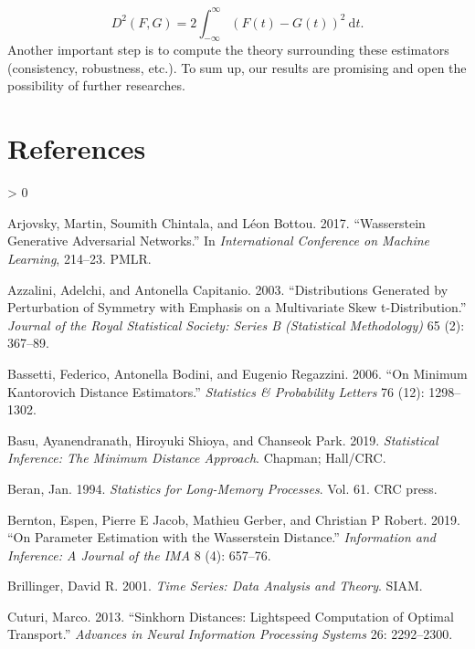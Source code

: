 \documentclass[
  11pt,
]{article}
\newlength{\cslhangindent}
\newenvironment{CSLReferences}[2] %
 {%
  \setlength{\parindent}{0pt}
  \ifodd #1 \everypar{\setlength{\hangindent}{\cslhangindent}}\ignorespaces\fi
  \ifnum #2 > 0
  \setlength{\parskip}{#2\baselineskip}
  \fi
 }%
 {}
\begin{document}
\[D^{2}(F, G)=2 \int_{-\infty}^{\infty}(F(t)-G(t))^{2} \mathrm{~d} t.\]
Another important step is to compute the theory surrounding these
estimators (consistency, robustness, etc.). To sum up, our results are
promising and open the possibility of further researches.

\newpage

\hypertarget{references}{%
\section*{References}\label{references}}

\hypertarget{refs}{}
\begin{CSLReferences}{1}{0}
\leavevmode\hypertarget{ref-arjovsky2017wasserstein}{}%
Arjovsky, Martin, Soumith Chintala, and Léon Bottou. 2017.
{``Wasserstein Generative Adversarial Networks.''} In
\emph{International Conference on Machine Learning}, 214--23. PMLR.

\leavevmode\hypertarget{ref-azzalini2003distributions}{}%
Azzalini, Adelchi, and Antonella Capitanio. 2003. {``Distributions
Generated by Perturbation of Symmetry with Emphasis on a Multivariate
Skew t-Distribution.''} \emph{Journal of the Royal Statistical Society:
Series B (Statistical Methodology)} 65 (2): 367--89.

\leavevmode\hypertarget{ref-bassetti2006minimum}{}%
Bassetti, Federico, Antonella Bodini, and Eugenio Regazzini. 2006. {``On
Minimum Kantorovich Distance Estimators.''} \emph{Statistics \&
Probability Letters} 76 (12): 1298--1302.

\leavevmode\hypertarget{ref-basu2019statistical}{}%
Basu, Ayanendranath, Hiroyuki Shioya, and Chanseok Park. 2019.
\emph{Statistical Inference: The Minimum Distance Approach}. Chapman;
Hall/CRC.

\leavevmode\hypertarget{ref-beran1994statistics}{}%
Beran, Jan. 1994. \emph{Statistics for Long-Memory Processes}. Vol. 61.
CRC press.

\leavevmode\hypertarget{ref-bernton2019parameter}{}%
Bernton, Espen, Pierre E Jacob, Mathieu Gerber, and Christian P Robert.
2019. {``On Parameter Estimation with the Wasserstein Distance.''}
\emph{Information and Inference: A Journal of the IMA} 8 (4): 657--76.

\leavevmode\hypertarget{ref-brillinger2001time}{}%
Brillinger, David R. 2001. \emph{Time Series: Data Analysis and Theory}.
SIAM.

\leavevmode\hypertarget{ref-cuturi2013sinkhorn}{}%
Cuturi, Marco. 2013. {``Sinkhorn Distances: Lightspeed Computation of
Optimal Transport.''} \emph{Advances in Neural Information Processing
Systems} 26: 2292--2300.


\end{CSLReferences}
\end{document}

